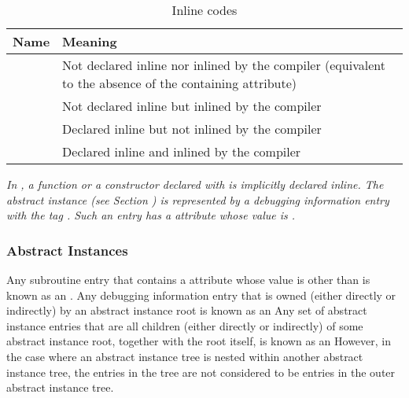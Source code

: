 \begin{table}[ht]
\centering
\caption{Inline codes}
\label{tab:inlinecodes}
\begin{tabular}{l|P{8cm}}
\hline
Name&Meaning\\ \hline
\DWINLnotinlinedTARG{} & Not declared inline nor inlined by the
  \mbox{compiler} (equivalent to the absence of the
  containing \DWATinline{} attribute) \\
\DWINLinlinedTARG{} & Not declared inline but inlined by the \mbox{compiler} \\
\DWINLdeclarednotinlinedTARG{} & Declared inline but
  not inlined by the \mbox{compiler} \\
\DWINLdeclaredinlinedTARG{} & Declared inline and inlined by the
  \mbox{compiler} \\
\hline
\end{tabular}
\end{table}

\textit{In , a function or a constructor declared with
 is implicitly declared inline. The abstract
instance (see Section )
is represented by a debugging information
entry with the tag \DWTAGsubprogram. Such an entry has a
\DWATinline{} attribute whose value is \DWINLinlined.}

\subsubsection{Abstract Instances}
\label{chap:abstractinstances}
Any subroutine entry that contains a
\DWATinlineDEFN{} attribute
whose value is other than
\DWINLnotinlined{}
is known as an .
\hypertarget{chap:DWATinlineabstracttinstance}{}
Any debugging information entry that is owned (either
directly or indirectly) by an abstract instance root
is known as an
Any set of abstract instance entries that are all
children (either directly or indirectly) of some abstract
instance root, together with the root itself, is known as an
However, in the case where an abstract instance tree is
nested within another abstract instance tree, the entries in the
tree are not considered to be entries in the outer abstract
instance tree.

